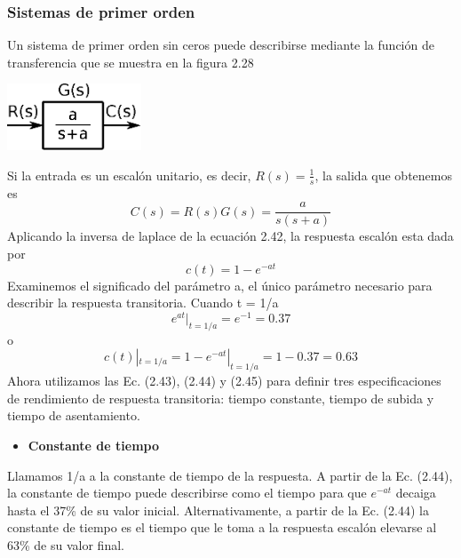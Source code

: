 \subsubsection{Sistemas de primer orden}
Un sistema de primer orden sin ceros puede describirse mediante la función de transferencia que se muestra en la figura 2.28
\begin{center}
	\includegraphics[width=0.3\textwidth]{Contenido/Cuerpo/Capitulo2/Fig26.eps}
	\label{fig:MarcoTeorico:Fig25}
\end{center}
Si la entrada es un escalón unitario, es decir, $R(s) = \frac{1}{s}$, la salida que obtenemos es 
\begin{equation}
	C(s) = R(s)G(s) = \frac{a}{s(s+a)}
\end{equation}
Aplicando la inversa de laplace de la ecuación 2.42, la respuesta escalón esta dada por
\begin{equation}
	c(t) = 1 - e^{-at}
\end{equation}
Examinemos el significado del parámetro a, el único parámetro necesario para describir la respuesta transitoria. Cuando t = 1/a
\begin{equation}
	e^{at}|_{t=1/a} = e^{-1} = 0.37
\end{equation}
o
\begin{equation}
	c(t)|_{t=1/a} = 1-e^{-at}|_{t=1/a} = 1 - 0.37 = 0.63
\end{equation}
Ahora utilizamos las Ec. (2.43), (2.44) y (2.45) para definir tres especificaciones de rendimiento de respuesta transitoria: tiempo constante, 
tiempo de subida y tiempo de asentamiento.
\begin{itemize}
	\item \textbf{Constante de tiempo}
\end{itemize}
Llamamos 1/a a la constante de tiempo de la respuesta. A partir de la Ec. (2.44), la constante de tiempo puede describirse como el tiempo para que $e^{-at}$ decaiga hasta el 37\% de su valor inicial. 
Alternativamente, a partir de la Ec. (2.44) la constante de tiempo es el tiempo que le toma a la respuesta escalón elevarse al 63\% de su valor final.
